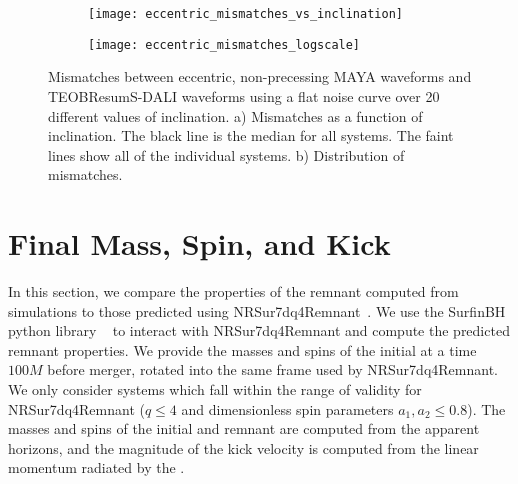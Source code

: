 \documentclass[
twocolumn,prd,
showpacs,
nofootinbib,
amsmath,amssymb,
superscriptaddress]{revtex4-1}
\newcommand{\DS}[1]{{\textcolor{magenta}{\sf{[DS: #1]}}}}
\begin{document}
\begin{figure*}
\centering
\begin{subfigure}[t]{.48\textwidth}
    \centering
   \texttt{[image: eccentric\_mismatches\_vs\_inclination]}
    \caption{}
    \label{fig:eccentric_mismatches_vs_inclination}
\end{subfigure}
\begin{subfigure}[t]{.48\textwidth}
    \centering
    \texttt{[image: eccentric\_mismatches\_logscale]}
 	\caption{}
 	\label{fig:eccentric_mismatch_distribution}
\end{subfigure}
\caption{Mismatches between eccentric, non-precessing MAYA waveforms and TEOBResumS-DALI waveforms using a flat noise curve over 20 different values of inclination. a) Mismatches as a function of inclination.  The black line is the median for all systems. The faint lines show all of the individual systems.  b) Distribution of mismatches.} 
\label{fig:eccentric_mismatches}
\end{figure*}


\section{Final Mass, Spin, and Kick}\label{sec:final_state}

In this section, we compare the properties of the remnant \bh{} computed from \nr{} simulations to those predicted using NRSur7dq4Remnant~\cite{Varma:2019csw}.
We use the SurfinBH python library ~\cite{Varma:2018aht, vijay_varma_2018_1435832} to interact with NRSur7dq4Remnant and compute the predicted remnant properties.
We provide the masses and spins of the initial  at a time $100 M$ before merger, rotated into the same frame used by NRSur7dq4Remnant.
We only consider systems which fall within the range of validity for NRSur7dq4Remnant ($q \leq 4$ and dimensionless spin parameters $a_1, a_2 \leq 0.8$). 
The masses and spins of the initial and remnant  are computed from the \bh{} apparent horizons, and the magnitude of the kick velocity is computed from the linear momentum radiated by the .
\end{document}

